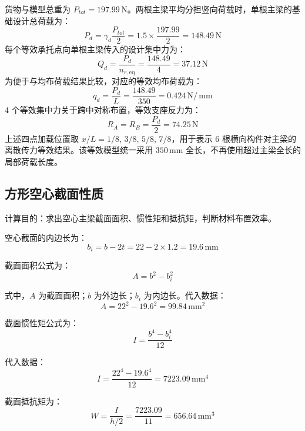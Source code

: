 \documentclass[UTF8,a4paper,12pt,fontset=none]{ctexart}
\numberwithin{equation}{section}
\numberwithin{figure}{section}
\numberwithin{table}{section}
\newcommand{\mm}{\,\mathrm{mm}}
\newcommand{\Nunit}{\,\mathrm{N}}
\begin{document}
货物与模型总重为 $P_{tot}=197.99\Nunit$。两根主梁平均分担竖向荷载时，单根主梁的基础设计总荷载为：
\begin{equation}
  P_d=\gamma_d\frac{P_{tot}}{2}=1.5\times\frac{197.99}{2}=148.49\Nunit
\end{equation}
每个等效承托点向单根主梁传入的设计集中力为：
\begin{equation}
  Q_d=\frac{P_d}{n_{r,\mathrm{eq}}}=\frac{148.49}{4}=37.12\Nunit
\end{equation}
为便于与均布荷载结果比较，对应的等效均布荷载为：
\begin{equation}
  q_d=\frac{P_d}{L}=\frac{148.49}{350}=0.424\Nunit/\mm
\end{equation}
4 个等效集中力关于跨中对称布置，等效支座反力为：
\begin{equation}
  R_A=R_B=\frac{P_d}{2}=74.25\Nunit
\end{equation}
上述四点加载位置取 $x/L=1/8,\,3/8,\,5/8,\,7/8$，用于表示 6 根横向构件对主梁的离散传力等效结果。该等效模型统一采用 $350\mm$ 全长，不再使用超过主梁全长的局部荷载长度。

\subsection{方形空心截面性质}
计算目的：求出空心主梁截面面积、惯性矩和抵抗矩，判断材料布置效率。

空心截面的内边长为：
\begin{equation}
  b_i=b-2t=22-2\times1.2=19.6\mm
\end{equation}

截面面积公式为：
\begin{equation}
  A=b^2-b_i^2
\end{equation}

式中，$A$ 为截面面积；$b$ 为外边长；$b_i$ 为内边长。代入数据：
\begin{equation}
  A=22^2-19.6^2=99.84\mm^2
\end{equation}

截面惯性矩公式为：
\begin{equation}
  I=\frac{b^4-b_i^4}{12}
\end{equation}

代入数据：
\begin{equation}
  I=\frac{22^4-19.6^4}{12}=7223.09\mm^4
\end{equation}

截面抵抗矩为：
\begin{equation}
  W=\frac{I}{h/2}=\frac{7223.09}{11}=656.64\mm^3
\end{equation}
\end{document}
